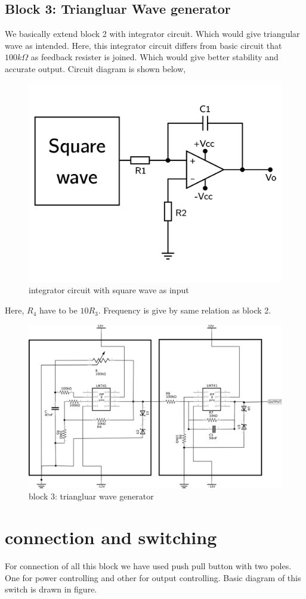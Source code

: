 \documentclass{article}
\begin{document}
\subsection{Block 3: Triangluar Wave generator}
\label{sec:orgf25fdb7}

We basically extend block 2 with integrator circuit. Which would give triangular wave as intended. Here, this integrator circuit differs from basic circuit that \(100k\Omega\) as feedback resister is joined. Which would give better stability and accurate output. Circuit diagram is shown below,



\begin{figure}[htbp]
\centering
\includegraphics[width=0.8 \textwidth]{imgs/triang.png}
\caption{\label{fig:org0dff170}integrator circuit with square wave as input}
\end{figure}


Here, \(R_{4}\) have to be \(10R_{3}\). Frequency is give by same relation as block 2.



\begin{figure}[htbp]
\centering
\includegraphics[width=0.8 \textwidth]{imgs/triangreal.png}
\caption{\label{fig:org2433890}block 3: triangluar wave generator}
\end{figure}




\section{connection and switching}
\label{sec:org2f21826}

For connection of all this block we have used push pull button with two poles. One for power controlling and other for output controlling. Basic diagram of this switch is drawn in figure.
\end{document}

